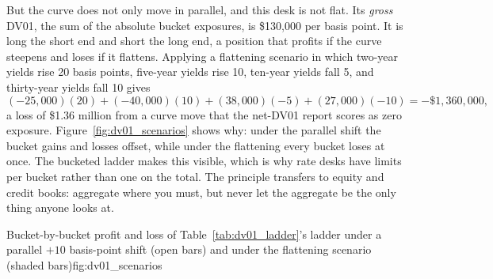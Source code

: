 \documentclass[../ai_in_finance]{subfiles}
\begin{document}
But the curve does not only move in parallel, and this desk is not flat. Its \emph{gross} DV01, the sum of the absolute bucket exposures, is \$130,000 per basis point. It is long the short end and short the long end, a position that profits if the curve steepens and loses if it flattens. Applying a flattening scenario in which two-year yields rise 20 basis points, five-year yields rise 10, ten-year yields fall 5, and thirty-year yields fall 10 gives
\begin{equation*}
(-25{,}000)(20) + (-40{,}000)(10) + (38{,}000)(-5) + (27{,}000)(-10) = -\$1{,}360{,}000,
\end{equation*}
a loss of \$1.36 million from a curve move that the net-DV01 report scores as zero exposure. Figure~\ref{fig:dv01_scenarios} shows why: under the parallel shift the bucket gains and losses offset, while under the flattening every bucket loses at once. The bucketed ladder makes this visible, which is why rate desks have limits per bucket rather than one on the total. The principle transfers to equity and credit books: aggregate where you must, but never let the aggregate be the only thing anyone looks at.

\begin{bookfigure}{Bucket-by-bucket profit and loss of Table~\ref{tab:dv01_ladder}'s ladder under a parallel $+10$ basis-point shift (open bars) and under the flattening scenario (shaded bars)}{fig:dv01_scenarios}
\end{bookfigure}
\end{document}
